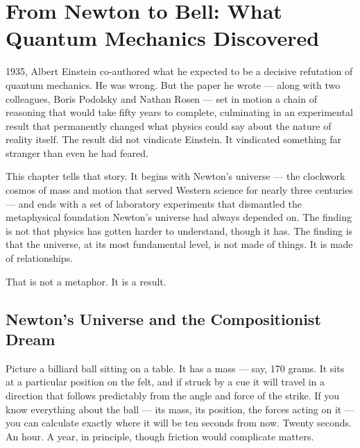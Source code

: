 \chapter[From Newton to Bell]{From Newton to Bell: What Quantum Mechanics Discovered}
\label{ch:newton-bell}


 1935, Albert Einstein co-authored what he expected to be a decisive refutation of quantum mechanics. He was wrong. But the paper he wrote --- along with two colleagues, Boris Podolsky and Nathan Rosen --- set in motion a chain of reasoning that would take fifty years to complete, culminating in an experimental result that permanently changed what physics could say about the nature of reality itself. The result did not vindicate Einstein. It vindicated something far stranger than even he had feared.

This chapter tells that story. It begins with Newton's universe --- the clockwork cosmos of mass and motion that served Western science for nearly three centuries --- and ends with a set of laboratory experiments that dismantled the metaphysical foundation Newton's universe had always depended on. The finding is not that physics has gotten harder to understand, though it has. The finding is that the universe, at its most fundamental level, is not made of things. It is made of relationships.

That is not a metaphor. It is a result.

\section{Newton's Universe and the Compositionist Dream}
\label{sec:ch1-newton}

Picture a billiard ball sitting on a table. It has a mass --- say, 170 grams. It sits at a particular position on the felt, and if struck by a cue it will travel in a direction that follows predictably from the angle and force of the strike. If you know everything about the ball --- its mass, its position, the forces acting on it --- you can calculate exactly where it will be ten seconds from now. Twenty seconds. An hour. A year, in principle, though friction would complicate matters.

